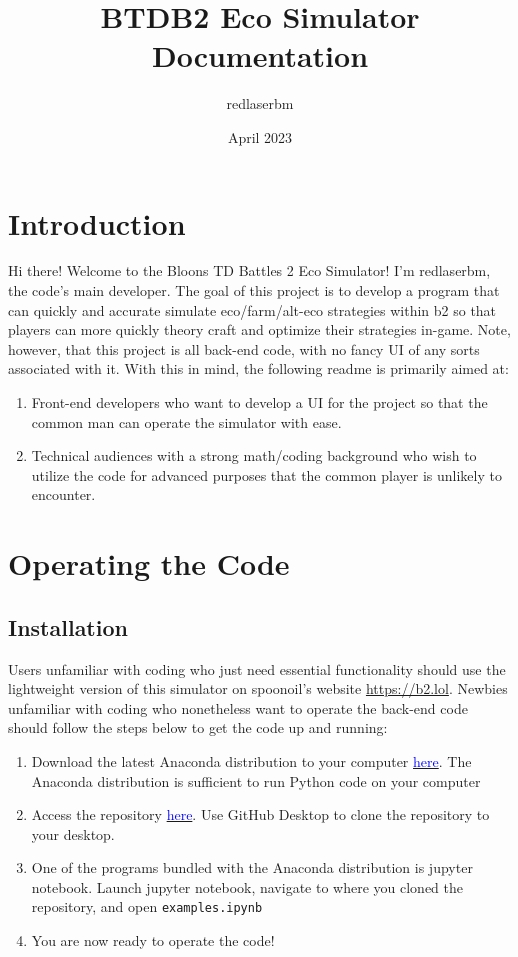 \documentclass[12pt,letterpaper]{article}
\theoremstyle{remark}
\theoremstyle{plain}
\begin{document}
\title{BTDB2 Eco Simulator Documentation}
\author{redlaserbm}
\date{April 2023}
\maketitle

\section{Introduction}

Hi there! Welcome to the Bloons TD Battles 2 Eco Simulator! I'm redlaserbm, the code's main developer. The goal of this project is to develop a program that can quickly and accurate simulate eco/farm/alt-eco strategies within b2 so that players can more quickly theory craft and optimize their strategies in-game. Note, however, that this project is all back-end code, with no fancy UI of any sorts associated with it. With this in mind, the following readme is primarily aimed at:

\begin{enumerate}
    \item Front-end developers who want to develop a UI for the project so that the common man can operate the simulator with ease.
    \item Technical audiences with a strong math/coding background who wish to utilize the code for advanced purposes that the common player is unlikely to encounter.
\end{enumerate}


\section{Operating the Code}

\subsection{Installation}

Users unfamiliar with coding who just need essential functionality should use the lightweight version of this simulator on spoonoil's website \url{https://b2.lol}. Newbies unfamiliar with coding who nonetheless want to operate the back-end code should follow the steps below to get the code up and running:
\begin{enumerate}
	\item Download the latest Anaconda distribution to your computer \href{https://www.anaconda.com/download/}{\textcolor{blue}{here}}. The Anaconda distribution is sufficient to run Python code on your computer
	\item Access the repository \href{https://github.com/redlaserbmBTD/BTDB2_SIMULATOR}{\textcolor{blue}{here}}. Use GitHub Desktop to clone the repository to your desktop. 
	\item One of the programs bundled with the Anaconda distribution is jupyter notebook. Launch jupyter notebook, navigate to where you cloned the repository, and open \texttt{examples.ipynb}
	\item You are now ready to operate the code!
\end{enumerate} 
\end{document}
